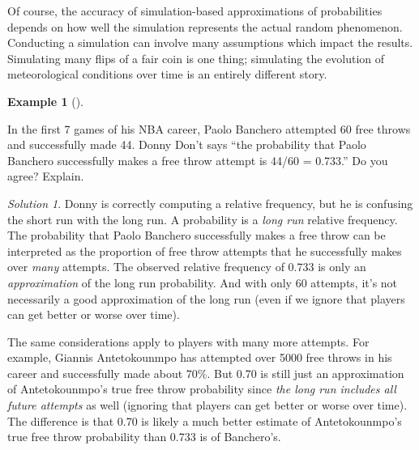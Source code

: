 \documentclass[
  letterpaper,
  DIV=11,
  numbers=noendperiod]{scrreprt}
\theoremstyle{plain}
\theoremstyle{definition}
\newtheorem{example}{Example}[chapter]
\theoremstyle{definition}
\theoremstyle{definition}
\theoremstyle{remark}
\newtheorem{refsolution}{Solution}[chapter]
\begin{document}
Of course, the accuracy of simulation-based approximations of
probabilities depends on how well the simulation represents the actual
random phenomenon. Conducting a simulation can involve many assumptions
which impact the results. Simulating many flips of a fair coin is one
thing; simulating the evolution of meteorological conditions over time
is an entirely different story.

\begin{tcolorbox}[enhanced jigsaw, opacityback=0, left=2mm, colframe=quarto-callout-note-color-frame, toprule=.15mm, breakable, colback=white, leftrule=.75mm, arc=.35mm, rightrule=.15mm, bottomrule=.15mm]

\begin{example}[]\protect\hypertarget{exm-donny-assumption-versus-observation}{}\label{exm-donny-assumption-versus-observation}

In the first 7 games of his NBA career, Paolo Banchero attempted 60 free
throws and successfully made 44. Donny Don't says ``the probability that
Paolo Banchero successfully makes a free throw attempt is 44/60 =
0.733.'' Do you agree? Explain.

\end{example}

\end{tcolorbox}

\begin{tcolorbox}[enhanced jigsaw, opacityback=0, rightrule=.15mm, coltitle=black, colframe=quarto-callout-tip-color-frame, toprule=.15mm, colbacktitle=quarto-callout-tip-color!10!white, opacitybacktitle=0.6, left=2mm, toptitle=1mm, breakable, title={Solution (click to expand)}, bottomtitle=1mm, colback=white, leftrule=.75mm, titlerule=0mm, arc=.35mm, bottomrule=.15mm]

\begin{refsolution}
Donny is correctly computing a relative frequency, but he is confusing
the short run with the long run. A probability is a \emph{long run}
relative frequency. The probability that Paolo Banchero successfully
makes a free throw can be interpreted as the proportion of free throw
attempts that he successfully makes over \emph{many} attempts. The
observed relative frequency of 0.733 is only an \emph{approximation} of
the long run probability. And with only 60 attempts, it's not
necessarily a good approximation of the long run (even if we ignore that
players can get better or worse over time).

The same considerations apply to players with many more attempts. For
example, Giannis Antetokounmpo has attempted over 5000 free throws in
his career and successfully made about 70\%. But 0.70 is still just an
approximation of Antetokounmpo's true free throw probability since
\emph{the long run includes all future attempts} as well (ignoring that
players can get better or worse over time). The difference is that 0.70
is likely a much better estimate of Antetokounmpo's true free throw
probability than 0.733 is of Banchero's.

\label{sol-donny-assumption-versus-observation}

\end{refsolution}

\end{tcolorbox}
\end{document}
